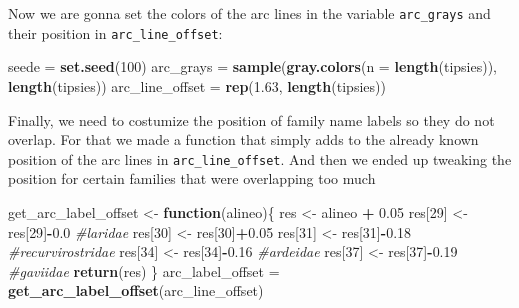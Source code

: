 \documentclass[]{article}
\newenvironment{Shaded}{\begin{snugshade}}{\end{snugshade}}
\newcommand{\CommentTok}[1]{\textcolor[rgb]{0.56,0.35,0.01}{\textit{#1}}}
\newcommand{\ControlFlowTok}[1]{\textcolor[rgb]{0.13,0.29,0.53}{\textbf{#1}}}
\newcommand{\DataTypeTok}[1]{\textcolor[rgb]{0.13,0.29,0.53}{#1}}
\newcommand{\DecValTok}[1]{\textcolor[rgb]{0.00,0.00,0.81}{#1}}
\newcommand{\FloatTok}[1]{\textcolor[rgb]{0.00,0.00,0.81}{#1}}
\newcommand{\KeywordTok}[1]{\textcolor[rgb]{0.13,0.29,0.53}{\textbf{#1}}}
\newcommand{\NormalTok}[1]{#1}
\newcommand{\OperatorTok}[1]{\textcolor[rgb]{0.81,0.36,0.00}{\textbf{#1}}}
\newcommand{\StringTok}[1]{\textcolor[rgb]{0.31,0.60,0.02}{#1}}
\begin{document}
Now we are gonna set the colors of the arc lines in the variable \texttt{arc\_grays} and their position in \texttt{arc\_line\_offset}:

\begin{Shaded}
\begin{Highlighting}[]
\NormalTok{seede =}\StringTok{ }\KeywordTok{set.seed}\NormalTok{(}\DecValTok{100}\NormalTok{)}
\NormalTok{arc_grays =}\StringTok{ }\KeywordTok{sample}\NormalTok{(}\KeywordTok{gray.colors}\NormalTok{(}\DataTypeTok{n =} \KeywordTok{length}\NormalTok{(tipsies)), }\KeywordTok{length}\NormalTok{(tipsies))}
\NormalTok{arc_line_offset =}\StringTok{ }\KeywordTok{rep}\NormalTok{(}\FloatTok{1.63}\NormalTok{, }\KeywordTok{length}\NormalTok{(tipsies))}
\end{Highlighting}
\end{Shaded}

Finally, we need to costumize the position of family name labels so they do not overlap.
For that we made a function that simply adds to the already known position of the arc lines in \texttt{arc\_line\_offset}.
And then we ended up tweaking the position for certain families that were overlapping too much

\begin{Shaded}
\begin{Highlighting}[]
\NormalTok{get_arc_label_offset <-}\StringTok{ }\ControlFlowTok{function}\NormalTok{(alineo)\{}
\NormalTok{    res <-}\StringTok{ }\NormalTok{alineo }\OperatorTok{+}\StringTok{ }\FloatTok{0.05}
\NormalTok{    res[}\DecValTok{29}\NormalTok{] <-}\StringTok{ }\NormalTok{res[}\DecValTok{29}\NormalTok{]}\OperatorTok{-}\FloatTok{0.0} \CommentTok{#laridae}
\NormalTok{    res[}\DecValTok{30}\NormalTok{] <-}\StringTok{ }\NormalTok{res[}\DecValTok{30}\NormalTok{]}\OperatorTok{+}\FloatTok{0.05}
\NormalTok{    res[}\DecValTok{31}\NormalTok{] <-}\StringTok{ }\NormalTok{res[}\DecValTok{31}\NormalTok{]}\OperatorTok{-}\FloatTok{0.18} \CommentTok{#recurvirostridae}
\NormalTok{    res[}\DecValTok{34}\NormalTok{] <-}\StringTok{ }\NormalTok{res[}\DecValTok{34}\NormalTok{]}\OperatorTok{-}\FloatTok{0.16} \CommentTok{#ardeidae}
\NormalTok{    res[}\DecValTok{37}\NormalTok{] <-}\StringTok{ }\NormalTok{res[}\DecValTok{37}\NormalTok{]}\OperatorTok{-}\FloatTok{0.19} \CommentTok{#gaviidae}
    \KeywordTok{return}\NormalTok{(res)}
\NormalTok{\}}
\NormalTok{arc_label_offset =}\StringTok{ }\KeywordTok{get_arc_label_offset}\NormalTok{(arc_line_offset)}
\end{Highlighting}
\end{Shaded}
\end{document}
